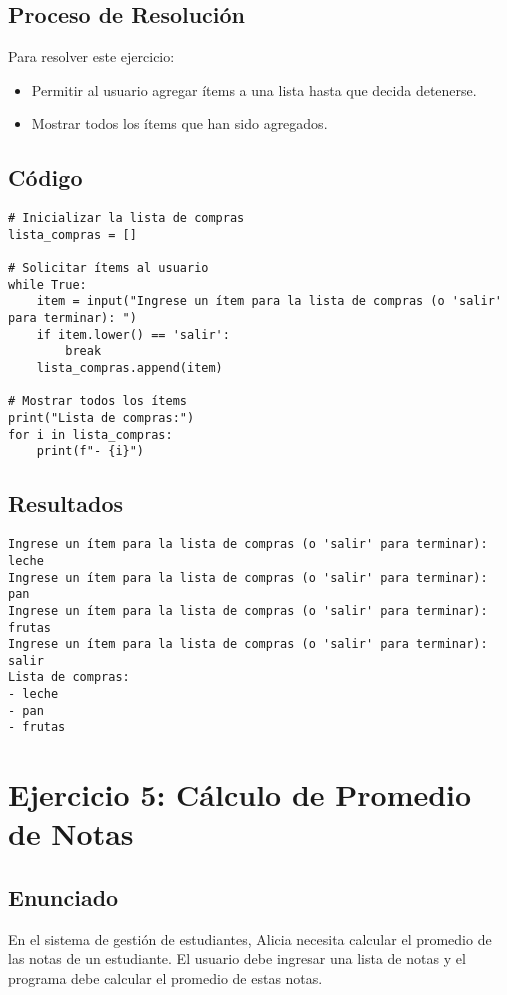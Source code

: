 \documentclass[a4paper,12pt]{article}
\begin{document}
\subsection{Proceso de Resolución}
Para resolver este ejercicio:
\begin{itemize}
    \item Permitir al usuario agregar ítems a una lista hasta que decida detenerse.
    \item Mostrar todos los ítems que han sido agregados.
\end{itemize}

\subsection{Código}
\begin{lstlisting}
# Inicializar la lista de compras
lista_compras = []

# Solicitar ítems al usuario
while True:
    item = input("Ingrese un ítem para la lista de compras (o 'salir' para terminar): ")
    if item.lower() == 'salir':
        break
    lista_compras.append(item)

# Mostrar todos los ítems
print("Lista de compras:")
for i in lista_compras:
    print(f"- {i}")
\end{lstlisting}

\subsection{Resultados}
\begin{verbatim}
Ingrese un ítem para la lista de compras (o 'salir' para terminar): leche
Ingrese un ítem para la lista de compras (o 'salir' para terminar): pan
Ingrese un ítem para la lista de compras (o 'salir' para terminar): frutas
Ingrese un ítem para la lista de compras (o 'salir' para terminar): salir
Lista de compras:
- leche
- pan
- frutas
\end{verbatim}

\newpage
\section{Ejercicio 5: Cálculo de Promedio de Notas}

\subsection{Enunciado}
En el sistema de gestión de estudiantes, Alicia necesita calcular el promedio de las notas de un estudiante. El usuario debe ingresar una lista de notas y el programa debe calcular el promedio de estas notas.
\end{document}
